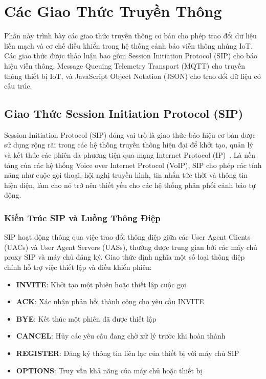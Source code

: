 \section{Các Giao Thức Truyền Thông}
\label{sec:communication_protocols}

Phần này trình bày các giao thức truyền thông cơ bản cho phép trao đổi dữ liệu liền mạch và cơ chế điều khiển trong hệ thống cảnh báo viễn thông nhúng IoT. Các giao thức được thảo luận bao gồm Session Initiation Protocol (SIP) cho báo hiệu viễn thông, Message Queuing Telemetry Transport (MQTT) cho truyền thông thiết bị IoT, và JavaScript Object Notation (JSON) cho trao đổi dữ liệu có cấu trúc.

\subsection{Giao Thức Session Initiation Protocol (SIP)}
\label{subsec:sip_protocol}

Session Initiation Protocol (SIP) đóng vai trò là giao thức báo hiệu cơ bản được sử dụng rộng rãi trong các hệ thống truyền thông hiện đại để khởi tạo, quản lý và kết thúc các phiên đa phương tiện qua mạng Internet Protocol (IP)~\cite{sip_rfc3261}. Là nền tảng của các hệ thống Voice over Internet Protocol (VoIP), SIP cho phép các tính năng như cuộc gọi thoại, hội nghị truyền hình, tin nhắn tức thời và thông tin hiện diện, làm cho nó trở nên thiết yếu cho các hệ thống phân phối cảnh báo tự động.

\subsubsection{Kiến Trúc SIP và Luồng Thông Điệp}
\label{subsubsec:sip_architecture}

SIP hoạt động thông qua việc trao đổi thông điệp giữa các User Agent Clients (UACs) và User Agent Servers (UASs), thường được trung gian bởi các máy chủ proxy SIP và máy chủ đăng ký. Giao thức định nghĩa một số loại thông điệp chính hỗ trợ việc thiết lập và điều khiển phiên:

\begin{itemize}
    \item \textbf{INVITE}: Khởi tạo một phiên hoặc thiết lập cuộc gọi
    \item \textbf{ACK}: Xác nhận phản hồi thành công cho yêu cầu INVITE
    \item \textbf{BYE}: Kết thúc một phiên đã được thiết lập
    \item \textbf{CANCEL}: Hủy các yêu cầu đang chờ xử lý trước khi hoàn thành
    \item \textbf{REGISTER}: Đăng ký thông tin liên lạc của thiết bị với máy chủ SIP
    \item \textbf{OPTIONS}: Truy vấn khả năng của máy chủ hoặc thiết bị
\end{itemize}

